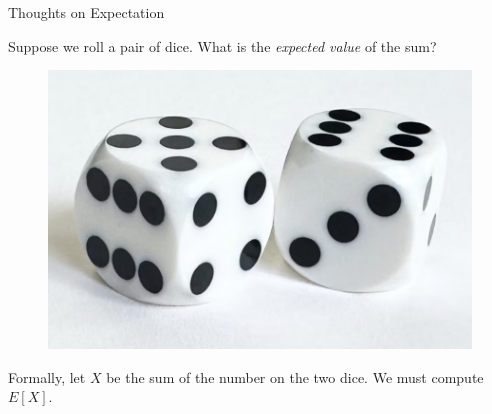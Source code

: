 \documentclass[10pt]{beamer}
\begin{document}
\begin{frame}[standout]
Thoughts on Expectation
\end{frame}





\begin{frame}

Suppose we roll a pair of dice.  What is the \textit{expected value} of the sum?
\vfill 
\begin{figure}

\includegraphics[width=.8\textwidth]{images/pair_of_dice.png}
\end{figure}
\vfill 
Formally, let $X$ be the sum of the number on the two dice.  We must compute $E[X]$.
	
\end{frame}
\end{document}
